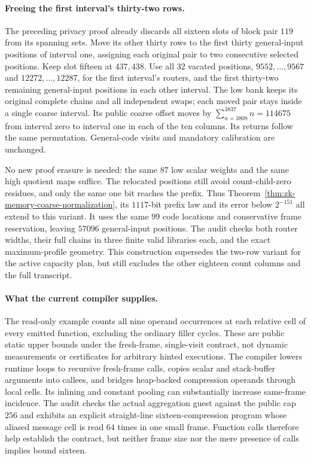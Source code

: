 \paragraph{Freeing the first interval's thirty-two rows.} The preceding privacy proof already discards all sixteen slots of block pair $119$ from its spanning sets. Move its other thirty rows to the first thirty general-input positions of interval one, assigning each original pair to two consecutive selected positions. Keep slot fifteen at $437,438$. Use all $32$ vacated positions, $9552,\ldots,9567$ and $12272,\ldots,12287$, for the first interval's routers, and the first thirty-two remaining general-input positions in each other interval. The low bank keeps its original complete chains and all independent swaps; each moved pair stays inside a single coarse interval. Its public coarse offset moves by $\sum_{n=3808}^{3837}n=114675$ from interval zero to interval one in each of the ten columns. Its returns follow the same permutation. General-code visits and mandatory calibration are unchanged.

No new proof erasure is needed: the same $87$ low scalar weights and the same high quotient maps suffice. The relocated positions still avoid count-child-zero residues, and only the same one bit reaches the prefix. Thus Theorem~\ref{thm:zk-memory-coarse-normalization}, its $1117$-bit prefix law and its error below $2^{-151}$ all extend to this variant. It uses the same $99$ code locations and conservative frame reservation, leaving $57096$ general-input positions. The audit checks both router widths, their full chains in three finite valid libraries each, and the exact maximum-profile geometry. This construction supersedes the two-row variant for the active capacity plan, but still excludes the other eighteen count columns and the full transcript.

\paragraph{What the current compiler supplies.} The read-only example  counts all nine operand occurrences at each relative cell of every emitted function, excluding the ordinary filler cycles. These are public static upper bounds under the fresh-frame, single-visit contract, not dynamic measurements or certificates for arbitrary hinted executions. The compiler lowers runtime loops to recursive fresh-frame calls, copies scalar and stack-buffer arguments into callees, and bridges heap-backed compression operands through local cells. Its inlining and constant pooling can substantially increase same-frame incidence. The audit checks the actual aggregation guest against the public cap $256$ and exhibits an explicit straight-line sixteen-compression program whose aliased message cell is read $64$ times in one small frame. Function calls therefore help establish the contract, but neither frame size nor the mere presence of calls implies bound sixteen.

